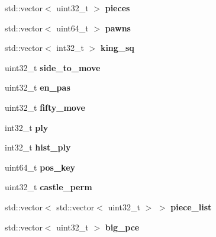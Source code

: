 \begin{DoxyCompactItemize}
\item 
\mbox{\label{classBoard_a47a3111cc3c0026571baeb01dd71b3a2}} 
std\+::vector$<$ uint32\+\_\+t $>$ {\bfseries pieces}
\item 
\mbox{\label{classBoard_a6c5c1e1423c9b6b9d495fc1d31e96573}} 
std\+::vector$<$ uint64\+\_\+t $>$ {\bfseries pawns}
\item 
\mbox{\label{classBoard_a6546084187b2ccf29a10f64ea09a7e0c}} 
std\+::vector$<$ int32\+\_\+t $>$ {\bfseries king\+\_\+sq}
\item 
\mbox{\label{classBoard_a8d282a1a8eeb588ed520cf3561d4b733}} 
uint32\+\_\+t {\bfseries side\+\_\+to\+\_\+move}
\item 
\mbox{\label{classBoard_a17b2f81c74320df145a3a5327d7194b5}} 
uint32\+\_\+t {\bfseries en\+\_\+pas}
\item 
\mbox{\label{classBoard_abe45cab2eaae7e2580281352fbaeef86}} 
uint32\+\_\+t {\bfseries fifty\+\_\+move}
\item 
\mbox{\label{classBoard_a7b757de66ef8bd1fc5001a30f2f37534}} 
int32\+\_\+t {\bfseries ply}
\item 
\mbox{\label{classBoard_a208fc0898354ca9bf15fbd109c627abd}} 
int32\+\_\+t {\bfseries hist\+\_\+ply}
\item 
\mbox{\label{classBoard_a6cc3287e1565e4fae61ffdd1b8975c03}} 
uint64\+\_\+t {\bfseries pos\+\_\+key}
\item 
\mbox{\label{classBoard_a09e4430a38cad60da56cafb69336d29e}} 
uint32\+\_\+t {\bfseries castle\+\_\+perm}
\item 
\mbox{\label{classBoard_a1eccd1cb47a855caa1ed9d44cfc2f698}} 
std\+::vector$<$ std\+::vector$<$ uint32\+\_\+t $>$ $>$ {\bfseries piece\+\_\+list}
\item 
\mbox{\label{classBoard_a0eb07b018b2dbd00e98260b53d747405}} 
std\+::vector$<$ uint32\+\_\+t $>$ {\bfseries big\+\_\+pce}

\end{DoxyCompactItemize}
